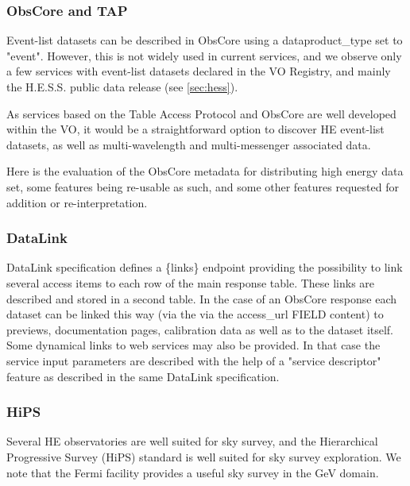 \documentclass[11pt,a4paper]{ivoa}
\begin{document}
\subsubsection{ObsCore and TAP}

Event-list datasets can be described in ObsCore using a dataproduct\_type set to "event". However, this is not widely used in current services, and we observe only a few services with event-list datasets declared in the VO Registry, and mainly the H.E.S.S. public data release (see \ref{sec:hess}).

As services based on the Table Access Protocol \citep{2019ivoa.spec.0927D} and ObsCore are well developed within the VO, it would be a straightforward option to discover HE event-list datasets, as well as multi-wavelength and multi-messenger associated data.

Here is the evaluation of the ObsCore metadata for distributing high energy data set, some features being re-usable as such, and some other features requested for addition or re-interpretation.


\subsubsection{DataLink}


DataLink specification \citep{2023ivoa.spec.1215B} defines a \{links\} endpoint providing the possibility to link several
access items to each row of the main response table. These links are described and stored in a second
table. In the case of an ObsCore response each dataset can be linked this way (via the via the access\_url
FIELD content) to previews, documentation pages, calibration data as well as to the dataset itself.
Some dynamical links to web services may also be provided. In that case the service input parameters are
described with the help of a "service descriptor" feature as described in the same DataLink specification.

\subsubsection{HiPS}

Several HE observatories are well suited for sky survey, and the Hierarchical Progressive Survey (HiPS) standard is well suited for sky survey exploration. We note that the Fermi facility provides a useful sky survey in the GeV domain.
\end{document}
